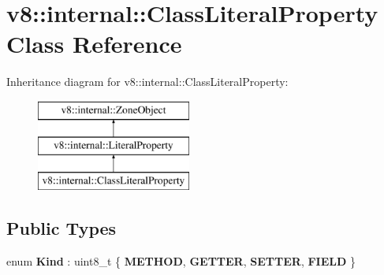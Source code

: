 \hypertarget{classv8_1_1internal_1_1ClassLiteralProperty}{}\section{v8\+:\+:internal\+:\+:Class\+Literal\+Property Class Reference}
\label{classv8_1_1internal_1_1ClassLiteralProperty}
Inheritance diagram for v8\+:\+:internal\+:\+:Class\+Literal\+Property\+:\begin{figure}[H]
\begin{center}
\leavevmode
\includegraphics[height=3.000000cm]{classv8_1_1internal_1_1ClassLiteralProperty}
\end{center}
\end{figure}
\subsection*{Public Types}
\begin{DoxyCompactItemize}
\item 
\mbox{\label{classv8_1_1internal_1_1ClassLiteralProperty_a6337ac1796c0270a31eb498f1dd6b489}} 
enum {\bfseries Kind} \+: uint8\+\_\+t \{ {\bfseries M\+E\+T\+H\+OD}, 
{\bfseries G\+E\+T\+T\+ER}, 
{\bfseries S\+E\+T\+T\+ER}, 
{\bfseries F\+I\+E\+LD}
 \}
\end{DoxyCompactItemize}
